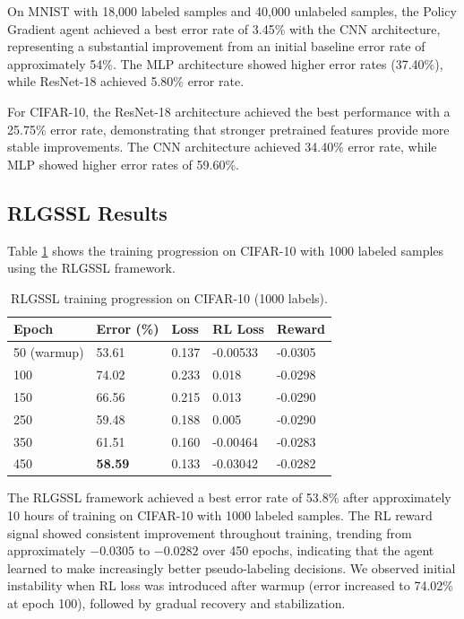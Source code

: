 \documentclass[pdflatex,sn-mathphys-num]{sn-jnl}%
\theoremstyle{thmstyleone}%
\theoremstyle{thmstyletwo}%
\theoremstyle{thmstylethree}%
\begin{document}
On MNIST with 18,000 labeled samples and 40,000 unlabeled samples, the Policy Gradient agent achieved a best error rate of 3.45\% with the CNN architecture, representing a substantial improvement from an initial baseline error rate of approximately 54\%. The MLP architecture showed higher error rates (37.40\%), while ResNet-18 achieved 5.80\% error rate.

For CIFAR-10, the ResNet-18 architecture achieved the best performance with a 25.75\% error rate, demonstrating that stronger pretrained features provide more stable improvements. The CNN architecture achieved 34.40\% error rate, while MLP showed higher error rates of 59.60\%.

\subsection{RLGSSL Results}
Table \ref{tab:rlgssl_training} shows the training progression on CIFAR-10 with 1000 labeled samples using the RLGSSL framework.

\begin{table}[h]
\caption{RLGSSL training progression on CIFAR-10 (1000 labels).}\label{tab:rlgssl_training}
\begin{tabular}{@{}lllll@{}}
\toprule
Epoch & Error (\%) & Loss & RL Loss & Reward \\
\midrule
50 (warmup) & 53.61 & 0.137 & -0.00533 & -0.0305 \\
100 & 74.02 & 0.233 & 0.018 & -0.0298 \\
150 & 66.56 & 0.215 & 0.013 & -0.0290 \\
250 & 59.48 & 0.188 & 0.005 & -0.0290 \\
350 & 61.51 & 0.160 & -0.00464 & -0.0283 \\
450 & \textbf{58.59} & 0.133 & -0.03042 & -0.0282 \\
\bottomrule
\end{tabular}
\end{table}

The RLGSSL framework achieved a best error rate of 53.8\% after approximately 10 hours of training on CIFAR-10 with 1000 labeled samples. The RL reward signal showed consistent improvement throughout training, trending from approximately $-0.0305$ to $-0.0282$ over 450 epochs, indicating that the agent learned to make increasingly better pseudo-labeling decisions. We observed initial instability when RL loss was introduced after warmup (error increased to 74.02\% at epoch 100), followed by gradual recovery and stabilization.
\end{document}
